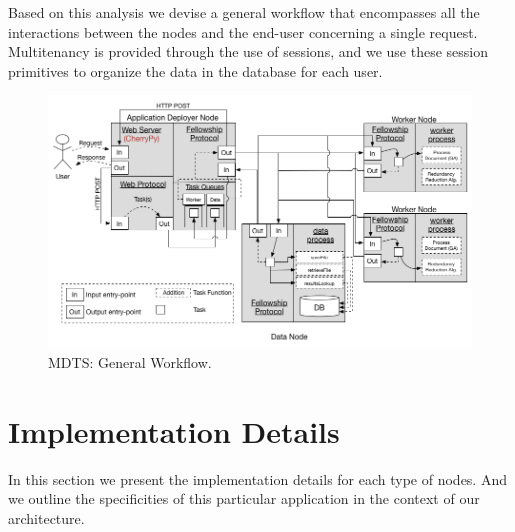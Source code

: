 \documentclass[12pt, titlepage]{uo_temp}
\begin{document}
     Based on this analysis we devise a general workflow that encompasses all the
     interactions between the nodes and the end-user concerning a single
     request. Multitenancy is provided through the use of sessions, and we use these
     session primitives to organize the data in the database for each user.

     \begin{figure}[h!]
       \centering
       \includegraphics[width=150mm]{images/mdts_overview.png}
       \caption{MDTS: General Workflow.}
     \end{figure}


     \section{Implementation Details}
     In this section we present the implementation details for each type of nodes. And we
     outline the specificities of this particular application in the context of our
     architecture.
\end{document}
